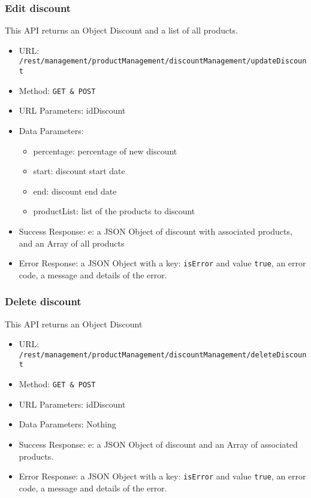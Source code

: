 \subsubsection*{Edit discount}
This API returns an Object Discount and a list of all products.

\begin{itemize}
    \item URL: \texttt{/rest/management/productManagement/discountManagement/updateDiscount}
    \item Method: \texttt{{GET \& POST}}
    \item URL Parameters: idDiscount
    \item Data Parameters: 
    \begin{itemize}
        \item percentage: percentage of new discount
        \item start: discount start date
        \item end: discount end date
        \item productList: list of the products to discount
    \end{itemize}
    \item Success Response: e: a JSON Object of discount with associated products, and an Array of all products 
    \item Error Response: a JSON Object with a key: \texttt{isError}  and value \texttt{true}, an error code, a message and details of the error.
\end{itemize}

\subsubsection*{Delete discount}
This API returns an Object Discount

\begin{itemize}
    \item URL: \texttt{/rest/management/productManagement/discountManagement/deleteDiscount}
    \item Method: \texttt{{GET \& POST}}
    \item URL Parameters: idDiscount
    \item Data Parameters: Nothing
    \item Success Response: e: a JSON Object of discount and an Array of associated products. 
    \item Error Response: a JSON Object with a key: \texttt{isError}  and value \texttt{true}, an error code, a message and details of the error.
\end{itemize}

